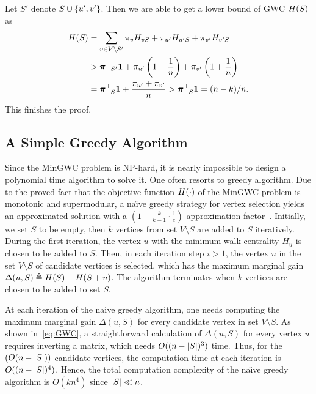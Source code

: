 \documentclass[10pt,twocolumn,twoside]{IEEEtran}
\begin{document}
\begin{IEEEproof}
    Let \(S'\) denote \(S\cup\left\{u',v' \right\}\). Then we are able to get a lower bound of GWC $H(S)$ as
    \begin{align*}
        H(S) & =\sum_{v\in V\setminus S'}\pi_vH_{vS}+\pi_{u'}H_{u'S}+\pi_{v'}H_{v'S}            \\
                 & >\boldsymbol{\pi}_{-S'}\boldsymbol{1}+\pi_{u'}\left( 1+\frac{1}{n} \right)+\pi_{v'}\left( 1+\frac{1}{n} \right) \\
                 & =\boldsymbol{\pi}_{-S}^\top\boldsymbol{1}+\frac{\pi_{u'}+\pi_{v'}}n
        >\boldsymbol{\pi}_{-S}^\top\boldsymbol{1}=(n-k)/n.
    \end{align*}
    This finishes the proof.
\end{IEEEproof}

\subsection{A Simple Greedy Algorithm}

Since the MinGWC problem is NP-hard, it is nearly impossible to design a polynomial time algorithm to solve it. One often resorts to greedy algorithm. Due to the proved fact that the objective function \(H(\cdot)\) of  the MinGWC problem is monotonic and supermodular, a na\"{\i}ve greedy strategy for vertex selection yields an approximated   solution  with a $(1-\frac{k}{k-1}\cdot\frac{1}{e})$ approximation factor~\cite{NeWoFi78}. Initially, we set $S$ to be empty, then $k$ vertices from set $V \setminus S$ are added to $S$ iteratively. During the first iteration, the vertex $u$ with the minimum walk centrality $H_u$ is chosen to be added to $S$. Then, in each iteration step $i>1$, the vertex $u$ in the set $V \setminus S$ of candidate vertices is selected, which has the maximum marginal gain $\Delta(u,S) \triangleq H(S)-H(S+u)$.  The algorithm terminates when $k$ vertices are chosen to be added to set $S$.

At each iteration of the naive greedy algorithm, one needs computing the maximum marginal gain $\Delta(u,S)$ for every candidate vertex in set $V \setminus S$. As shown in~\eqref{eq:GWC}, a straightforward calculation of  $\Delta(u,S)$ for every vertex \(u\) requires inverting a matrix, which needs $O((n-\left|S \right|)^3)$ time.  Thus, for the $(O(n-\left|S \right|))$ candidate vertices, the computation time at each iteration is $O((n-\left|S \right|)^4)$. Hence, the total computation complexity of the na\"{\i}ve greedy algorithm is \(O(kn^4)\) since $\left|S \right| \ll n$.
\end{document}
